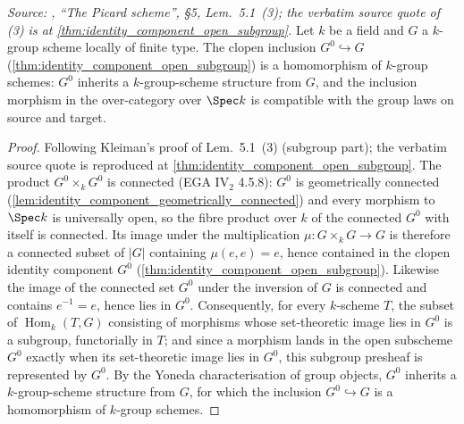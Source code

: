 \begin{theorem}\leanok
  \label{thm:identity_component_is_subgroup_homomorphism}

  \textit{Source: \cite{kleiman-picard}, ``The Picard scheme'', \S 5,
  Lem.~5.1~(3); the verbatim source quote of (3) is at
  \cref{thm:identity_component_open_subgroup}.}
  Let \(k\) be a field and \(G\) a \(k\)-group scheme locally of finite
  type. The clopen inclusion \(G^0 \hookrightarrow G\)
  (\cref{thm:identity_component_open_subgroup}) is a homomorphism of
  \(k\)-group schemes: \(G^0\) inherits a \(k\)-group-scheme structure
  from \(G\), and the inclusion morphism in the over-category over
  \(\Spec k\) is compatible with the group laws on source and target.
\end{theorem}

\begin{proof}
  \leanok
  Following Kleiman's proof of Lem.~5.1~(3) (subgroup part); the
  verbatim source quote is reproduced at
  \cref{thm:identity_component_open_subgroup}.
  The product \(G^0 \times_k G^0\) is connected (EGA IV\(_2\) 4.5.8):
  \(G^0\) is geometrically connected
  (\cref{lem:identity_component_geometrically_connected}) and every
  morphism to \(\Spec k\) is universally open, so the fibre product over
  \(k\) of the connected \(G^0\) with itself is connected. Its image under
  the multiplication \(\mu : G \times_k G \to G\) is therefore a connected
  subset of \(|G|\) containing \(\mu(e, e) = e\), hence contained in the
  clopen identity component \(G^0\)
  (\cref{thm:identity_component_open_subgroup}). Likewise the image of the
  connected set \(G^0\) under the inversion of \(G\) is connected and
  contains \(e^{-1} = e\), hence lies in \(G^0\). Consequently, for every
  \(k\)-scheme \(T\), the subset of \(\operatorname{Hom}_k(T, G)\)
  consisting of morphisms whose set-theoretic image lies in \(G^0\) is a
  subgroup, functorially in \(T\); and since a morphism lands in the open
  subscheme \(G^0\) exactly when its set-theoretic image lies in \(G^0\),
  this subgroup presheaf is represented by \(G^0\). By the Yoneda
  characterisation of group objects, \(G^0\) inherits a \(k\)-group-scheme
  structure from \(G\), for which the inclusion \(G^0 \hookrightarrow G\)
  is a homomorphism of \(k\)-group schemes.
\end{proof}


